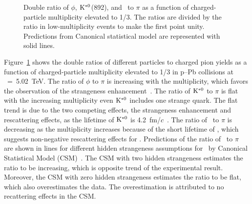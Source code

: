 \begin{figure}[!hbt]
	\centering
	\caption{ Double ratio of $\phi$, $\rm{}K^{*0}$(892), and \fzero~to $\pi$ as a function of charged-particle multiplicity elevated to 1/3. The ratios are divided by the ratio in low-multiplicity events to make the first point unity. Predictions from Canonical statistical model are represented with solid lines. }
	\label{fig:f0piAddCSM}
\end{figure}

Figure~\ref{fig:f0piAddCSM} shows the double ratios of different particles to charged pion yields as a function of charged-particle multiplicity elevated to 1/3 in p--Pb collisions at \snn~=~5.02~TeV. The ratio of $\phi$ to $\pi$ is increasing with the multiplicity, which favors the observation of the strangeness enhancement~\cite{ALICE:2016fzo}. The ratio of $\rm{}K^{*0}$ to $\pi$ is flat with the increasing multiplicity even $\rm{}K^{*0}$ includes one strange quark. The flat trend is due to the two competing effects, the strangeness enhancement and rescattering effects, as the lifetime of $\rm{}K^{*0}$ is 4.2~fm/$c$~\cite{ParticleDataGroup:2020ssz}. The ratio of \fzero~to $\pi$ is decreasing as the multiplicity increases because of the short lifetime of \fzero, which suggests non-negative rescattering effects for \fzero. Predictions of the ratio of \fzero~to $\pi$ are shown in lines for different hidden strangeness assumptions for \fzero~by Canonical Statistical Model (CSM)~\cite{Vovchenko:2019kes}. The CSM with two hidden strangeness estimates the ratio to be increasing, which is opposite trend of the experimental result. Moreover, the CSM with zero hidden strangeness estimates the ratio to be flat, which also overestimates the data. The overestimation is attributed to no recattering effects in the CSM.

